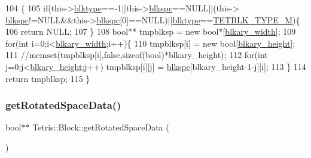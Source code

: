 \begin{DoxyCode}
104                                  \{
105                 \textcolor{keywordflow}{if}(this->\hyperlink{class_tetris_1_1_block_aceac58dcf8d8afaa82c2bab101cb3cff}{blktype}==-1||this->\hyperlink{class_tetris_1_1_block_af2f96c83a3511d32321672f794aa4db1}{blkspc}==NULL||(this->
      \hyperlink{class_tetris_1_1_block_af2f96c83a3511d32321672f794aa4db1}{blkspc}!=NULL&&this->\hyperlink{class_tetris_1_1_block_af2f96c83a3511d32321672f794aa4db1}{blkspc}[0]==NULL)||\hyperlink{class_tetris_1_1_block_aceac58dcf8d8afaa82c2bab101cb3cff}{blktype}==\hyperlink{_block_8h_a6da1e2b8848e1a7b5a7ee687fd6492bd}{TETBLK\_TYPE\_M})\{
106                     \textcolor{keywordflow}{return} NULL;
107                 \}
108                 \textcolor{keywordtype}{bool}** tmpblksp = \textcolor{keyword}{new} \textcolor{keywordtype}{bool}*[\hyperlink{class_tetris_1_1_block_a96548cab58eb788af744b54192c7bea1}{blkary\_width}];
109                 \textcolor{keywordflow}{for}(\textcolor{keywordtype}{int} i=0;i<\hyperlink{class_tetris_1_1_block_a96548cab58eb788af744b54192c7bea1}{blkary\_width};i++)\{
110                     tmpblksp[i] = \textcolor{keyword}{new} \textcolor{keywordtype}{bool}[\hyperlink{class_tetris_1_1_block_abbea7737c2b1fb7339aab4dff13de27c}{blkary\_height}];
111                     \textcolor{comment}{//memset(tmpblksp[i],false,sizeof(bool)*blkary\_height);}
112                     \textcolor{keywordflow}{for}(\textcolor{keywordtype}{int} j=0;j<\hyperlink{class_tetris_1_1_block_abbea7737c2b1fb7339aab4dff13de27c}{blkary\_height};j++) tmpblksp[i][j] = 
      \hyperlink{class_tetris_1_1_block_af2f96c83a3511d32321672f794aa4db1}{blkspc}[blkary\_height-1-j][i];    
113                 \}
114                 \textcolor{keywordflow}{return} tmpblksp;
115             \}
\end{DoxyCode}
\mbox{\label{class_tetris_1_1_block_ada769278572785b24e8a91f620b97b81}} 
\subsubsection{\texorpdfstring{get\+Rotated\+Space\+Data()}{getRotatedSpaceData()}\hspace{0.1cm}{\footnotesize\ttfamily [2/2]}}
{\footnotesize\ttfamily bool$\ast$$\ast$ Tetris\+::\+Block\+::get\+Rotated\+Space\+Data (\begin{DoxyParamCaption}{ }\end{DoxyParamCaption})\hspace{0.3cm}{\ttfamily [inline]}}

